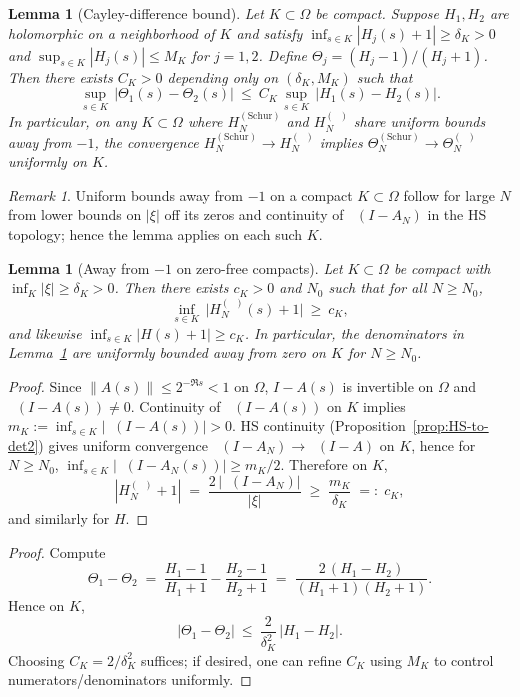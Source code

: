 \documentclass[11pt]{article}
\newtheorem{lemma}[theorem]{Lemma}
\theoremstyle{remark}
\newtheorem{remark}[theorem]{Remark}
\DeclareMathOperator{\dettwo}{det_2}
\begin{document}
\begin{lemma}[Cayley-difference bound]\label{lem:Cayley-diff}
Let $K\subset\Omega$ be compact. Suppose $H_1,H_2$ are holomorphic on a neighborhood of $K$ and satisfy $\inf_{s\in K}|H_j(s)+1|\ge \delta_K>0$ and $\sup_{s\in K}|H_j(s)|\le M_K$ for $j=1,2$. Define $\Theta_j=(H_j-1)/(H_j+1)$. Then there exists $C_K>0$ depending only on $(\delta_K,M_K)$ such that
\[
 \sup_{s\in K}\,\big|\Theta_1(s)-\Theta_2(s)\big|\ \le\ C_K\,\sup_{s\in K}\,\big|H_1(s)-H_2(s)\big|.
\]
In particular, on any $K\subset\Omega$ where $H_N^{(\mathrm{Schur})}$ and $H_N^{(\dettwo)}$ share uniform bounds away from $-1$, the convergence $H_N^{(\mathrm{Schur})}\to H_N^{(\dettwo)}$ implies $\Theta_N^{(\mathrm{Schur})}\to \Theta_N^{(\dettwo)}$ uniformly on $K$.
\end{lemma}
\begin{remark}
Uniform bounds away from $-1$ on a compact $K\subset\Omega$ follow for large $N$ from lower bounds on $|\xi|$ off its zeros and continuity of $\dettwo(I-A_N)$ in the HS topology; hence the lemma applies on each such $K$.
\end{remark}

\begin{lemma}[Away from $-1$ on zero-free compacts]\label{lem:away-minus-one}
Let $K\subset\Omega$ be compact with $\inf_{K}|\xi|\ge \delta_K>0$. Then there exists $c_K>0$ and $N_0$ such that for all $N\ge N_0$,
\[
 \inf_{s\in K}\,\bigl| H_N^{(\dettwo)}(s)+1\bigr|\ \ge\ c_K,
\]
and likewise $\inf_{s\in K}|H(s)+1|\ge c_K$. In particular, the denominators in Lemma~\ref{lem:Cayley-diff} are uniformly bounded away from zero on $K$ for $N\ge N_0$.
\end{lemma}
\begin{proof}
Since $\|A(s)\|\le 2^{-\Re s}<1$ on $\Omega$, $I-A(s)$ is invertible on $\Omega$ and $\dettwo(I-A(s))\ne 0$. Continuity of $\dettwo(I-A(s))$ on $K$ implies $m_K:=\inf_{s\in K}|\dettwo(I-A(s))|>0$. HS continuity (Proposition~\ref{prop:HS-to-det2}) gives uniform convergence $\dettwo(I-A_N)\to \dettwo(I-A)$ on $K$, hence for $N\ge N_0$, $\inf_{s\in K}|\dettwo(I-A_N(s))|\ge m_K/2$. Therefore on $K$,
\[
 |H_N^{(\dettwo)}+1|\;=\;\frac{2\,|\dettwo(I-A_N)|}{|\xi|}\;\ge\;\frac{m_K}{\delta_K}\;=:\;c_K,
\]
and similarly for $H$.
\end{proof}
\begin{proof}
Compute
\[
 \Theta_1-\Theta_2\;=\;\frac{H_1-1}{H_1+1}-\frac{H_2-1}{H_2+1}
 \;=\;\frac{2\,(H_1-H_2)}{(H_1+1)(H_2+1)}.
\]
Hence on $K$,
\[
 |\Theta_1-\Theta_2|\ \le\ \frac{2}{\delta_K^2}\,|H_1-H_2|.
\]
Choosing $C_K=2/\delta_K^2$ suffices; if desired, one can refine $C_K$ using $M_K$ to control numerators/denominators uniformly.
\end{proof}
\end{document}
